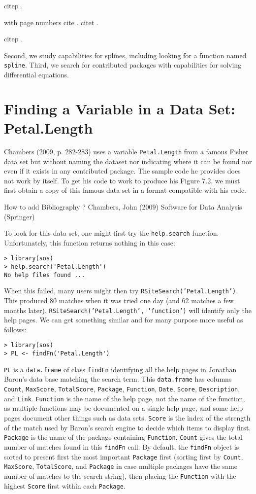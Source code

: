 citep \citep{JC09}.

with page numbers
cite \cite[pp. 282-283]{JC09}.
citet \citet[pp. 282-283]{JC09}.

citep \citep[pp. 282-283]{JC09}.

Second, we study \R{} capabilities
for splines, including looking for a function named {\tt spline}.  Third,
we search for contributed \R{} packages with capabilities for solving
differential equations.

\section*{Finding a Variable in a Data Set:  Petal.Length}

\citep[pp. 282-283]{JC09}
Chambers (2009, p. 282-283) uses a variable {\tt Petal.Length} from a
famous Fisher data set but without naming the dataset nor indicating
where it can be found nor even if it exists in any contributed \R{}
package.  The sample code he provides does not work by itself.  To get
his code to  work to produce his Figure 7.2, we must first obtain a
copy of this famous data set in a format compatible with his code.

How to add Bibliography ?
Chambers, John (2009) Software for Data Analysis (Springer)

To look for this data set, one might first try
the {\tt help.search} function.  Unfortunately, this function
returns nothing in this case:
\begin{verbatim}
> library(sos)
> help.search('Petal.Length')
No help files found ...
\end{verbatim}
When this failed, many users might then try
{\tt RSiteSearch('Petal.Length')}.  This produced 80 matches
when it was tried one day (and 62 matches a few months later).
{\tt RSiteSearch('Petal.Length', 'function')} will identify
only the help pages.  We can get something similar and for
many purpose more useful as follows:
\begin{verbatim}
> library(sos)
> PL <- findFn('Petal.Length')
\end{verbatim}
{\tt PL} is a {\tt data.frame} of class {\tt findFn} identifying
all the help pages in Jonathan Baron's data base matching the
search term.  This {\tt data.frame} has columns {\tt Count},
{\tt MaxScore}, {\tt TotalScore}, {\tt Package}, {\tt Function},
{\tt Date}, {\tt Score}, {\tt Description}, and {\tt Link}.
{\tt Function} is the name of the help page, not the name of the
function, as multiple functions may be documented on a single
help page, and some help pages document other things such as data
sets.  {\tt Score} is the index of the strength of the match used
by Baron's search engine to decide which items to display first.
{\tt Package} is the name of the package containing {\tt Function}.
{\tt Count} gives the total number of matches found in this
{\tt findFn} call.  By default, the {\tt findFn} object is sorted
to present first the most important {\tt Package} first (sorting first
by {\tt Count}, {\tt MaxScore},  {\tt TotalScore}, and {\tt Package}
in case multiple packages have the same number of matches to the
search string), then placing the {\tt Function} with the highest
{\tt Score} first within each {\tt Package}.

